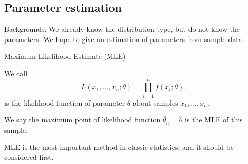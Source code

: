 \subsection{Parameter estimation}
\label{sub:Parameter estimation}
Backgrounds: We already know the distribution type, but do not know
the parameters. We hope to give an estimation of parameters from sample data.

Maximum Likelihood Estimate (MLE)

\begin{definition}
	We call \[
		L(x_1,\dots,x_n; \theta) = \prod_{i=1}^n f(x_i; \theta)
	.\]
	is the likelihood function of parameter $\theta$ about samples  $x_1,\dots,x_n$.

	We say the maximum point of likelihood function
	$\hat{\theta}_n = \hat{\theta}$ is the MLE of this sample.
\end{definition}

MLE is the most important method in classic statistics,
and it should be considered first.
